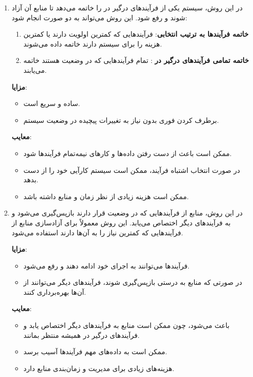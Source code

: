 \begin{qsolve}
	\begin{enumerate}
		\item {}
		در این روش، سیستم یکی از فرآیندهای درگیر در  را خاتمه می‌دهد تا منابع آن آزاد شوند و  رفع شود. این روش می‌تواند به دو صورت انجام شود:
		\begin{enumerate}
			\item \textbf{خاتمه فرآیندها به ترتیب انتخابی}: فرآیندهایی که کمترین اولویت دارند یا کمترین هزینه‌ را برای سیستم دارند خاتمه داده می‌شوند.
			\item \textbf{خاتمه تمامی فرآیندهای درگیر در }: تمام فرآیندهایی که در وضعیت  هستند خاتمه می‌یابند.
		\end{enumerate}
		
		\textbf{مزایا}:
		\begin{itemize}
			\item ساده و سریع است.
			\item برطرف کردن فوری  بدون نیاز به تغییرات پیچیده در وضعیت سیستم.
		\end{itemize}
		
		\textbf{معایب}:
		\begin{itemize}
			\item ممکن است باعث از دست رفتن داده‌ها و کارهای نیمه‌تمام فرآیندها شود.
			\item در صورت انتخاب اشتباه فرآیند، ممکن است سیستم کارآیی خود را از دست بدهد.
			\item ممکن است هزینه زیادی از نظر زمان و منابع داشته باشد.
		\end{itemize}
		
		\item {}
		در این روش، منابع از فرآیندهایی که در وضعیت  قرار دارند بازپس‌گیری می‌شود و به فرآیندهای دیگر اختصاص می‌یابد. این روش معمولاً برای آزادسازی منابع از فرآیندهایی که کمترین نیاز را به آن‌ها دارند استفاده می‌شود.
		
		\textbf{مزایا}:
		\begin{itemize}
			\item فرآیندها می‌توانند به اجرای خود ادامه دهند و  رفع می‌شود.
			\item در صورتی که منابع به درستی بازپس‌گیری شوند، فرآیندهای دیگر می‌توانند از آن‌ها بهره‌برداری کنند.
		\end{itemize}
		
		\textbf{معایب}:
		\begin{itemize}
			\item باعث  می‌شود، چون ممکن است منابع به فرآیندهای دیگر اختصاص یابد و فرآیندهای درگیر در  همیشه منتظر بمانند.
			\item ممکن است به داده‌های مهم فرآیندها آسیب برسد.
			\item هزینه‌های زیادی برای مدیریت و زمان‌بندی منابع دارد.
		\end{itemize}
		

\end{enumerate}
\end{qsolve}
